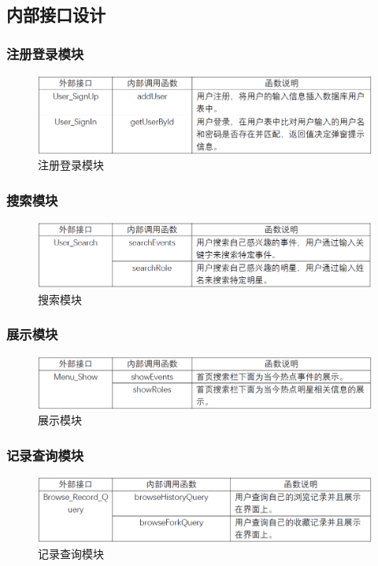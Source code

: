 \subsection{内部接口设计}
\subsubsection{注册登录模块}
\begin{figure}[!htbp]
	\centering
	\includegraphics[scale=0.4]{image/m2.png}
	\caption{注册登录模块}
\end{figure}
\subsubsection{搜索模块}
\begin{figure}[!htbp]
	\centering
	\includegraphics[scale=0.4]{image/m3.png}
	\caption{搜索模块}
\end{figure}
\subsubsection{展示模块}
\begin{figure}[!htbp]
	\centering
	\includegraphics[scale=0.4]{image/m4.png}
	\caption{展示模块}
\end{figure}
\subsubsection{记录查询模块}
\begin{figure}[!htbp]
	\centering
	\includegraphics[scale=0.4]{image/m5.png}
	\caption{记录查询模块}
\end{figure}
